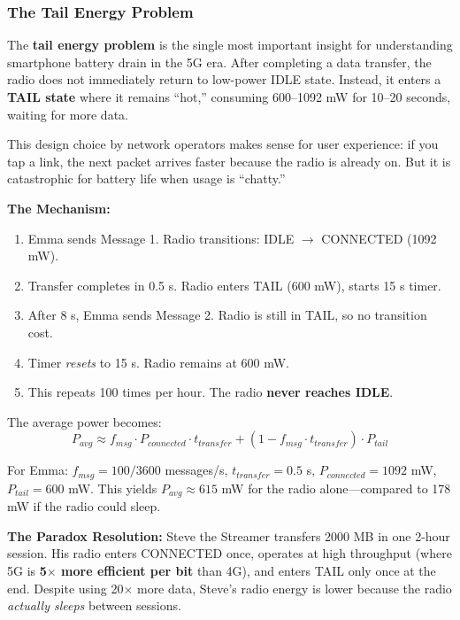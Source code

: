 \documentclass[12pt]{article}
\begin{document}
\subsubsection{The Tail Energy Problem}

The \textbf{tail energy problem} is the single most important insight for understanding smartphone battery drain in the 5G era. After completing a data transfer, the radio does not immediately return to low-power IDLE state. Instead, it enters a \textbf{TAIL state} where it remains ``hot,'' consuming 600--1092 mW for 10--20 seconds, waiting for more data.

This design choice by network operators makes sense for user experience: if you tap a link, the next packet arrives faster because the radio is already on. But it is catastrophic for battery life when usage is ``chatty.''

\textbf{The Mechanism:}
\begin{enumerate}
    \item Emma sends Message 1. Radio transitions: IDLE $\to$ CONNECTED (1092 mW).
    \item Transfer completes in 0.5 s. Radio enters TAIL (600 mW), starts 15 s timer.
    \item After 8 s, Emma sends Message 2. Radio is still in TAIL, so no transition cost.
    \item Timer \textit{resets} to 15 s. Radio remains at 600 mW.
    \item This repeats 100 times per hour. The radio \textbf{never reaches IDLE}.
\end{enumerate}

The average power becomes:
\begin{equation}
    P_{avg} \approx f_{msg} \cdot P_{connected} \cdot t_{transfer} + (1 - f_{msg} \cdot t_{transfer}) \cdot P_{tail}
\end{equation}

For Emma: $f_{msg} = 100/3600$ messages/s, $t_{transfer} = 0.5$ s, $P_{connected} = 1092$ mW, $P_{tail} = 600$ mW. This yields $P_{avg} \approx 615$ mW for the radio alone---compared to 178 mW if the radio could sleep.

\textbf{The Paradox Resolution:} Steve the Streamer transfers 2000 MB in one 2-hour session. His radio enters CONNECTED once, operates at high throughput (where 5G is \textbf{5$\times$ more efficient per bit} than 4G), and enters TAIL only once at the end. Despite using 20$\times$ more data, Steve's radio energy is lower because the radio \textit{actually sleeps} between sessions.
\end{document}
